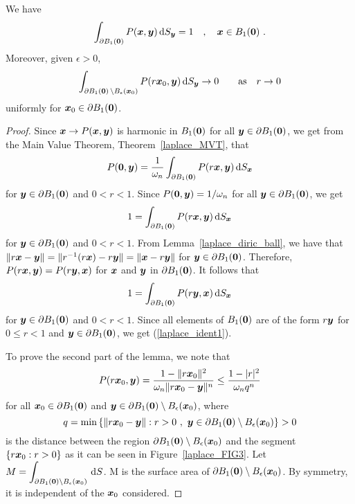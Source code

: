 \begin{lemma} \label{laplace_l_exist_ball}
We have
\begin{equation}   \label{laplace_ident1}
\int_{\partial B_1({\bm{0}})} P({\bm{x}},{\bm{y}}) \,\mathrm{d}{S}_{{\bm{y}}} = 1 \quad ,
\quad {\bm{x}} \in B_1({\bm{0}}) \ .
\end{equation}
Moreover, given $\epsilon >0$,
\[
\int_{\partial B_1({\bm{0}}) \,\setminus B_\epsilon({\bm{x}}_0)}
P(r{\bm{x}}_0,{\bm{y}}) \,\mathrm{d}{S}_{{\bm{y}}} \rightarrow  0 \qquad \text{as} \quad 
r\rightarrow 0
\]
uniformly for ${\bm{x}}_0 \in \partial B_1({\bm{0}})$.
\end{lemma}

\begin{proof}
Since ${\bm{x}} \rightarrow P({\bm{x}},{\bm{y}})$
is harmonic in $B_1({\bm{0}})$ for all ${\bm{y}}\in \partial B_1({\bm{0}})$,
we get from the Main Value Theorem, Theorem~\ref{laplace_MVT}, that 
\[
P({\bm{0}},{\bm{y}}) = \frac{1}{\omega_n} \int_{\partial B_1({\bm{0}})}
P(r{\bm{x}},{\bm{y}}) \,\mathrm{d}{S}_{{\bm{x}}}
\]
for ${\bm{y}} \in \partial B_1({\bm{0}})$ and $0<r<1$.
Since $\displaystyle P({\bm{0}},{\bm{y}}) = 1/\omega_n$ for all
${\bm{y}} \in \partial B_1({\bm{0}})$, we get
\[
1 = \int_{\partial B_1({\bm{0}})}
P(r{\bm{x}},{\bm{y}}) \,\mathrm{d}{S}_{{\bm{x}}}
\]
for ${\bm{y}} \in \partial B_1({\bm{0}})$ and $0<r<1$.
From Lemma~\ref{laplace_diric_ball}, we have that
$\|r{\bm{x}} - {\bm{y}}\| = \|r^{-1}(r{\bm{x}})- r {\bm{y}}\|
= \|{\bm{x}} - r {\bm{y}}\|$ for ${\bm{y}} \in \partial B_1({\bm{0}})$. 
Therefore, $\displaystyle P(r{\bm{x}},{\bm{y}}) = P(r{\bm{y}},{\bm{x}})$ for
${\bm{x}}$ and ${\bm{y}}$ in $\partial B_1({\bm{0}})$.  It follows that
\[
1 = \int_{\partial B_1({\bm{0}})}
P(r{\bm{y}},{\bm{x}}) \,\mathrm{d}{S}_{{\bm{x}}}
\]
for ${\bm{y}} \in \partial B_1({\bm{0}})$ and $0<r<1$.
Since all elements of $B_1({\bm{0}})$ are of the form $r{\bm{y}}$ for
$0\leq r <1$ and ${\bm{y}} \in \partial B_1({\bm{0}})$, we get
(\ref{laplace_ident1}).

To prove the second part of the lemma, we note that
\[
P(r{\bm{x}}_0,{\bm{y}}) =
\frac{1-\|r{\bm{x}}_0\|^2}{\omega_n\|r{\bm{x}}_0 - {\bm{y}}\|^n} \leq
\frac{1- |r|^2}{\omega_n q^n}
\]
for all $\displaystyle {\bm{x}}_0 \in \partial B_1({\bm{0}})$ and
$\displaystyle {\bm{y}} \in \partial B_1({\bm{0}})
\setminus B_\epsilon({\bm{x}}_0)$, where
\[
q = \min \left\{ \|r{\bm{x}}_0 - {\bm{y}} \| : r>0 \ , \ {\bm{y}} \in
\partial B_1({\bm{0}}) \setminus B_\epsilon({\bm{x}}_0) \right\} > 0
\]
is the distance between the region
$\partial B_1({\bm{0}}) \setminus B_\epsilon({\bm{x}}_0)$ and the segment
$\{ r{\bm{x}}_0 : r >0 \}$ as it can be seen in
Figure~\ref{laplace_FIG3}.  Let
$\displaystyle M =
\int_{\partial B_1({\bm{0}}) \setminus B_\epsilon({\bm{x}}_0)} \,\mathrm{d}{S}$.
M is the surface area of
$\partial B_1({\bm{0}}) \setminus B_\epsilon({\bm{x}}_0)$.  By symmetry,
it is independent of the ${\bm{x}}_0$ considered.


\end{proof}
